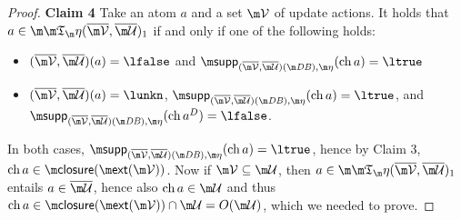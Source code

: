 \begin{proof}
\textbf{Claim 4}
Take an atom $a$ and a set $\VV$ of update actions. It holds that $a\in \Ap(\overline\VV,\overline\UU)_1$ if and only if one of the following holds:
\begin{itemize}
 \item $(\overline \VV,\overline \UU)(a) = \lfalse$ and $\supp_{(\overline\VV,\overline\UU)(\db),\aics}(\change a)=\ltrue$
 \item $(\overline \VV,\overline \UU)(a) = \lunkn$, $ \supp_{(\overline\VV,\overline\UU)(\db),\aics}(\change a)=\ltrue$, and $\supp_{(\overline\VV,\overline\UU)(\db),\aics}(\change a^D) = \lfalse$.
\end{itemize}
In both cases, $\supp_{(\overline\VV,\overline\UU)(\db),\aics}(\change a)=\ltrue$, hence by Claim 3, $\change a\in \closure(\ext(\VV))$. Now if $\VV\subseteq \UU$, then $a\in\Ap(\overline\VV,\overline\UU)_1$ entails $a\in \overline\UU$, hence also $\change a \in \UU$ and thus $\change a \in \closure(\ext(\VV)) \cap \UU = O(\UU)$, which we needed to prove. \qedhere




% 
% 
% 
% 
% 
% 
% 
%  
%  
%  
% 
% 
% 
% 
%  
%  
%  
%  
\end{proof}

